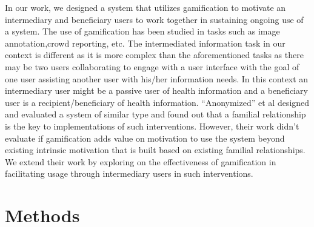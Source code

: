\documentclass{sig-alternate}
\begin{document}
In our work, we designed a system that  utilizes gamification to motivate an intermediary and beneficiary users to work together in sustaining ongoing use of a system. The use of gamification has been studied in tasks such as image annotation\cite{mekler2013:disassembling},crowd reporting\cite{crowley2012:gamification}, etc. The intermediated information task in our context is different as it is more complex than the aforementioned tasks as there may be two users collaborating to engage with a user interface with the goal of one user assisting another user with his/her information needs. In this context an intermediary  user might be a passive user of health information and a beneficiary user is a recipient/beneficiary of health information. ``Anonymized'' et al \cite{katule2016:leveraging} designed and evaluated a system of similar type and found out that a familial relationship is the key to implementations of such interventions. However, their work didn't evaluate if gamification adds value on motivation to use the system beyond existing intrinsic motivation that is built based on existing familial relationships. We extend their work by exploring on the effectiveness of gamification in facilitating usage through intermediary users in such interventions.
\section{Methods}
\end{document}
